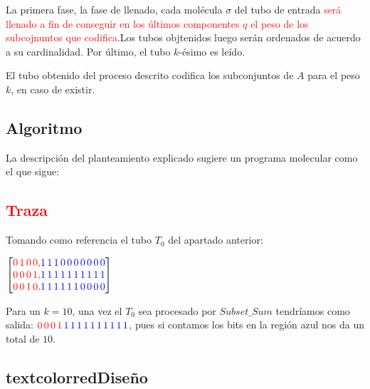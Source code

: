 \documentclass[12pt, letterpaper, twoside]{article}
\begin{document}
    La primera fase, la fase de llenado, cada molécula $\sigma$ del tubo de entrada \textcolor{red}{será llenado a fin de conseguir en los últimos componentes $q$ el peso de los subcojnuntos que codifica}.Los tubos objtenidos luego serán ordenados de acuerdo a su cardinalidad. Por último, el tubo $k$-ésimo es leído.

    El tubo obtenido del proceso descrito codifica los subconjuntos de $A$ para el peso $k$, en caso de existir.


    \subsection{Algoritmo}
    La descripción del planteamiento explicado sugiere un programa molecular como el que sigue:
    \begin{algorithm}
        \begin{algorithmic}[1]
            \EndProcedure
        \end{algorithmic}
    \end{algorithm}
    \subsection{\textcolor{red}{Traza}}
    Tomando como referencia el tubo $T_0$ del apartado anterior:


    $
        \begin{bmatrix}
            \textcolor{red}{0\,1\,0\,0,} \textcolor{blue}{1\,1\,1\,0\,0\,0\,0\,0\,0\,0} \\
            \textcolor{red}{0\,0\,0\,1,} \textcolor{blue}{1\,1\,1\,1\,1\,1\,1\,1\,1\,1} \\
            \textcolor{red}{0\,0\,1\,0,} \textcolor{blue}{1\,1\,1\,1\,1\,1\,0\,0\,0\,0}
        \end{bmatrix}
    $


    Para un $k=10$, una vez el $T_0$ sea procesado por $Subset\_Sum$ tendríamos como salida: $\textcolor{red}{0\,0\,0\,1\,} \textcolor{blue}{1\,1\,1\,1\,1\,1\,1\,1\,1\,1}$, pues si contamos los bits en la región azul nos da un total de $10$.

    \subsection{textcolor{red}{Diseño}}
\end{document}
